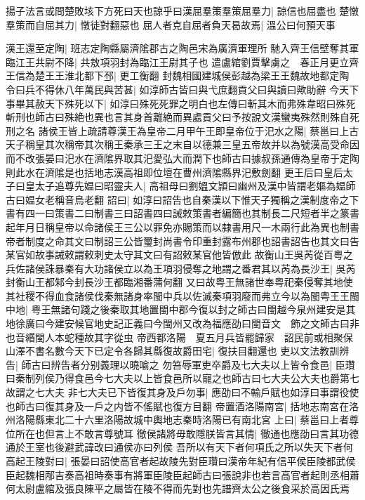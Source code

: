 揚子法言或問楚敗垓下方死曰天也諒乎曰漢屈羣策羣策屈羣力|{
	諒信也屈盡也}
楚憞羣策而自屈其力|{
	憞徒對翻惡也}
屈人者克自屈者負天曷故焉|{
	溫公曰何預天事}


漢王還至定陶|{
	班志定陶縣屬濟隂郡古之陶邑宋為廣濟軍理所}
馳入齊王信壁奪其軍　臨江王共尉不降|{
	共敖項羽封為臨江王尉其子也}
遣盧綰劉賈擊虜之　春正月更立齊王信為楚王王淮北都下邳|{
	更工衡翻}
封魏相國建城侯彭越為梁王王魏故地都定陶　令曰兵不得休八年萬民與苦甚|{
	如淳師古皆曰與弋庶翻貢父曰與讀曰歟助辭}
今天下事畢其赦天下殊死以下|{
	如淳曰殊死死罪之明白也左傳曰斬其木而弗殊韋昭曰殊死斬刑也師古曰殊絶也異也言其身首離絶而異處貢父曰予按說文漢蠻夷殊然則殊自死刑之名}
諸侯王皆上疏請尊漢王為皇帝二月甲午王即皇帝位于汜水之陽|{
	蔡邕曰上古天子稱皇其次稱帝其次稱王秦承三王之末自以德兼三皇五帝故并以為號漢高受命因而不改張晏曰汜水在濟隂界取其汜愛弘大而潤下也師古曰據叔孫通傳為皇帝于定陶則此水在濟隂是也括地志漢高祖即位壇在曹州濟隂縣界汜敷劍翻}
更王后曰皇后太子曰皇太子追尊先媪曰昭靈夫人|{
	高祖母曰劉媼文頴曰幽州及漢中皆謂老嫗為媪師古曰媪女老稱音烏老翻}
詔曰|{
	如淳曰詔告也自秦漢以下惟天子獨稱之漢制度帝之下書有四一曰策書二曰制書三曰詔書四曰誡敕策書者編簡也其制長二尺短者半之篆書起年月日稱皇帝以命諸侯王三公以罪免亦賜策而以隸書用尺一木兩行此為異也制書帝者制度之命其文曰制詔三公皆璽封尚書令印重封露布州郡也詔書詔告也其文曰告某官如故事誡敕謂敕刺史太守其文曰有詔敕某官他皆倣此}
故衡山王吳芮從百粤之兵佐諸侯誅暴秦有大功諸侯立以為王項羽侵奪之地謂之番君其以芮為長沙王|{
	吳芮封衡山王都邾今刲長沙王都臨湘番蒲何翻}
又曰故粤王無諸世奉粤祀秦侵奪其地使其社稷不得血食諸侯伐秦無諸身率閩中兵以佐滅秦項羽廢而弗立今以為閩粤王王閩中地|{
	粤王無諸句踐之後秦取其地置閩中郡今復以封之師古曰閩越今泉州建安是其地徐廣曰今建安候官地史記正義曰今閩州又改為福應劭曰閩音文　飾之文師古曰非也音緡閩人本蛇種故其字從虫}
帝西都洛陽　夏五月兵皆罷歸家　詔民前或相聚保山澤不書名數今天下已定令各歸其縣復故爵田宅|{
	復扶目翻還也}
吏以文法教訓辨告|{
	師古曰辨告者分别義理以曉喻之}
勿笞辱軍吏卒爵及七大夫以上皆令食邑|{
	臣瓚曰秦制列侯乃得食邑今七大夫以上皆食邑所以寵之也師古曰七大夫公大夫也爵第七故謂之七大夫}
非七大夫已下皆復其身及戶勿事|{
	應劭曰不輸戶賦也如淳曰事謂役使也師古曰復其身及一戶之内皆不傜賦也復方目翻}
帝置酒洛陽南宮|{
	括地志南宮在洛州洛陽縣東北二十六里洛陽故城中輿地志秦時洛陽已有南北宮}
上曰|{
	蔡邕曰上者尊位所在也但言上不敢言尊號耳}
徹侯諸將毋敢隱朕皆言其情|{
	徹通也應劭曰言其功德通於王室也後避武諱改曰通侯亦曰列侯}
吾所以有天下者何項氏之所以失天下者何高起王陵對曰|{
	張晏曰詔使高官者起故陵先對臣瓚曰漢帝年紀有信平侯臣陵都武侯臣起魏相邴吉奏高祖時奏事有將軍臣陵臣起師古曰張說非也若言高官者起則丞相蕭何太尉盧綰及張良陳平之屬皆在陵不得而先對也先譜齊太公之後食采於高因氏焉}
